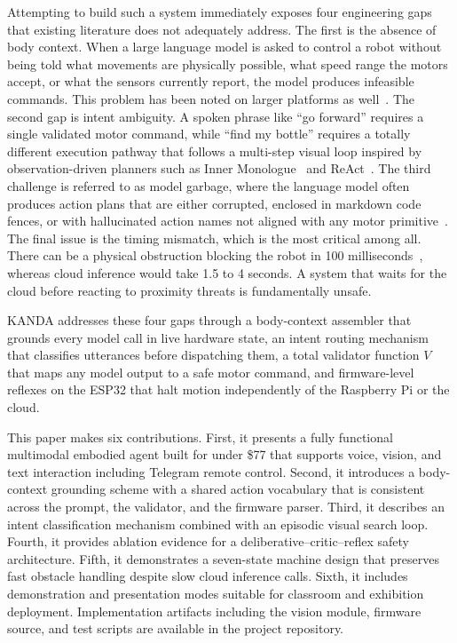 \documentclass[conference]{IEEEtran}
\begin{document}
Attempting to build such a system immediately exposes four engineering gaps that existing literature does not adequately address. The first is the absence of body context. When a large language model is asked to control a robot without being told what movements are physically possible, what speed range the motors accept, or what the sensors currently report, the model produces infeasible commands. This problem has been noted on larger platforms as well~\cite{ahn2022saycan,vemprala2024chatgpt}. The second gap is intent ambiguity. A spoken phrase like ``go forward'' requires a single validated motor command, while ``find my bottle'' requires a totally different execution pathway that follows a multi-step visual loop inspired by observation-driven planners such as Inner Monologue~\cite{huang2022innermonologue} and ReAct~\cite{yao2023react}. The third challenge is referred to as model garbage, where the language model often produces action plans that are either corrupted, enclosed in markdown code fences, or with hallucinated action names not aligned with any motor primitive~\cite{huang2023grounded}. The final issue is the timing mismatch, which is the most critical among all. There can be a physical obstruction blocking the robot in 100 milliseconds~\cite{brooks1986robust}, whereas cloud inference would take 1.5 to 4 seconds. A system that waits for the cloud before reacting to proximity threats is fundamentally unsafe.

KANDA addresses these four gaps through a body-context assembler that grounds every model call in live hardware state, an intent routing mechanism that classifies utterances before dispatching them, a total validator function $V$ that maps any model output to a safe motor command, and firmware-level reflexes on the ESP32 that halt motion independently of the Raspberry Pi or the cloud.

This paper makes six contributions. First, it presents a fully functional multimodal embodied agent built for under \$77 that supports voice, vision, and text interaction including Telegram remote control. Second, it introduces a body-context grounding scheme with a shared action vocabulary that is consistent across the prompt, the validator, and the firmware parser. Third, it describes an intent classification mechanism combined with an episodic visual search loop. Fourth, it provides ablation evidence for a deliberative--critic--reflex safety architecture. Fifth, it demonstrates a seven-state machine design that preserves fast obstacle handling despite slow cloud inference calls. Sixth, it includes demonstration and presentation modes suitable for classroom and exhibition deployment. Implementation artifacts including the vision module, firmware source, and test scripts are available in the project repository.
\end{document}
